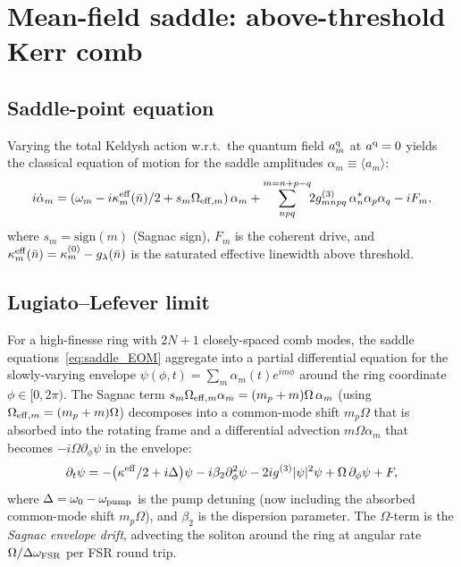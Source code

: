 \documentclass[11pt]{article}
\newcommand{\eff}{{\rm eff}}
\newcommand{\q}{{\rm q}}
\begin{document}
\section{Mean-field saddle: above-threshold Kerr comb}
\label{sec:saddle}

\subsection{Saddle-point equation}

Varying the total Keldysh action w.r.t.\ the quantum field
$a^\q_m$ at $a^\q=0$ yields the classical equation of motion
for the saddle amplitudes $\alpha_m \equiv \langle a_m\rangle$:
\begin{equation}
  i\dot\alpha_m = (\omega_m - i\kappa_m^{\eff}(\bar n)/2 + s_m\Omega_{\eff,m})\,\alpha_m
  + \sum_{npq}^{m=n+p-q}\!\! 2 g^{(3)}_{mnpq}\,\alpha_n^*\alpha_p\alpha_q
  - i F_m,
  \label{eq:saddle_EOM}
\end{equation}
where $s_m = \mathrm{sign}(m)$ (Sagnac sign), $F_m$ is the coherent
drive, and $\kappa_m^\eff(\bar n) = \kappa_m^{(0)} - g_\lambda(\bar n)$
is the saturated effective linewidth above threshold.

\subsection{Lugiato--Lefever limit}
\label{sec:LLE}

For a high-finesse ring with $2N+1$ closely-spaced comb modes, the
saddle equations~\eqref{eq:saddle_EOM} aggregate into a partial
differential equation for the slowly-varying envelope
$\psi(\phi,t) = \sum_m \alpha_m(t) e^{im\phi}$ around the ring
coordinate $\phi\in[0,2\pi)$.  The Sagnac term
$s_m\Omega_{\eff,m} \alpha_m = (m_p+m)\Omega\,\alpha_m$
(using $\Omega_{\eff,m}=(m_p+m)\Omega$) decomposes into a
common-mode shift $m_p\Omega$ that is absorbed into the rotating frame
and a differential advection $m\Omega\alpha_m$ that becomes $-i\Omega\partial_\phi\psi$
in the envelope:
\begin{equation}
  \partial_t \psi = -\bigl(\kappa^\eff/2 + i\Delta\bigr)\psi
  - i\beta_2 \partial_\phi^2\psi
  - 2 i g^{(3)}|\psi|^2\psi
  + \Omega\,\partial_\phi\psi
  + F,
  \label{eq:LLE_Sagnac}
\end{equation}
where $\Delta = \omega_0 - \omega_{\rm pump}$ is the pump detuning
(now including the absorbed common-mode shift $m_p\Omega$), and
$\beta_2$ is the dispersion parameter.  The $\Omega$-term is the
\emph{Sagnac envelope drift}, advecting the soliton around the ring
at angular rate $\Omega/\Delta\omega_{\rm FSR}$ per FSR round trip.
\end{document}
